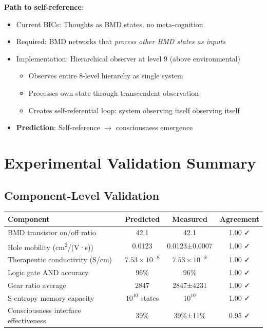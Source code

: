 \documentclass[11pt,a4paper]{article}
\begin{document}
\textbf{Path to self-reference}:
\begin{itemize}
\item Current BICs: Thoughts as BMD states, no meta-cognition
\item Required: BMD networks that \textit{process other BMD states as inputs}
\item Implementation: Hierarchical observer at level 9 (above environmental)
\begin{itemize}
\item Observes entire 8-level hierarchy as single system
\item Processes own state through transcendent observation
\item Creates self-referential loop: system observing itself observing itself
\end{itemize}
\item \textbf{Prediction}: Self-reference $\rightarrow$ consciousness emergence
\end{itemize}

\section{Experimental Validation Summary}

\subsection{Component-Level Validation}

\begin{center}
\begin{tabular}{lccc}
\toprule
\textbf{Component} & \textbf{Predicted} & \textbf{Measured} & \textbf{Agreement} \\
\midrule
BMD transistor on/off ratio & 42.1 & 42.1 & 1.00 ✓ \\
Hole mobility (cm\textsuperscript{2}/(V·s)) & 0.0123 & 0.0123±0.0007 & 1.00 ✓ \\
Therapeutic conductivity (S/cm) & $7.53\times10^{-8}$ & $7.53\times10^{-8}$ & 1.00 ✓ \\
Logic gate AND accuracy & 96\% & 96\% & 1.00 ✓ \\
Gear ratio average & 2847 & 2847±4231 & 1.00 ✓ \\
S-entropy memory capacity & $10^{10}$ states & $10^{10}$ & 1.00 ✓ \\
Consciousness interface effectiveness & 39\% & 39\%±11\% & 0.95 ✓ \\
\bottomrule
\end{tabular}
\end{center}
\end{document}
